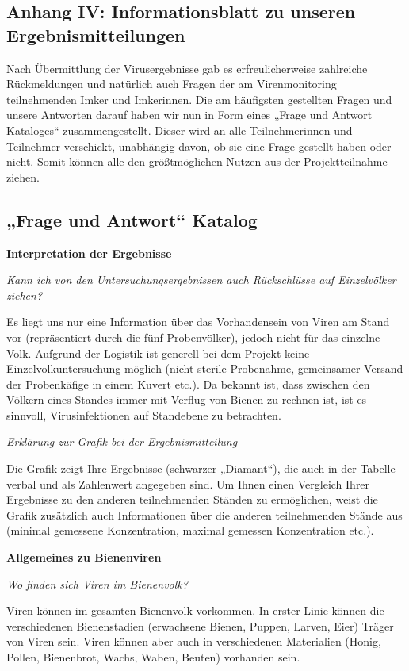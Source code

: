 \subsection{Anhang IV: Informationsblatt zu unseren Ergebnismitteilungen} \label{chap:anhang_FAQ}


Nach Übermittlung der Virusergebnisse gab es erfreulicherweise zahlreiche Rückmeldungen und natürlich auch Fragen der am Virenmonitoring teilnehmenden Imker und Imkerinnen. Die am häufigsten gestellten Fragen und unsere Antworten darauf haben wir nun in Form eines „Frage und Antwort Kataloges“ zusammengestellt. Dieser wird an alle Teilnehmerinnen und Teilnehmer verschickt, unabhängig davon, ob sie eine Frage gestellt haben oder nicht. Somit können alle den größtmöglichen Nutzen aus der Projektteilnahme ziehen.



\subsection{„Frage und Antwort“ Katalog}
\textbf{Interpretation der Ergebnisse}

\textit{Kann ich von den Untersuchungsergebnissen auch Rückschlüsse auf Einzelvölker ziehen?}

Es liegt uns nur eine Information über das Vorhandensein von Viren am Stand vor (repräsentiert durch die fünf Probenvölker), jedoch nicht für das einzelne Volk. Aufgrund der Logistik ist generell bei dem Projekt keine Einzelvolkuntersuchung möglich (nicht-sterile Probenahme, gemeinsamer Versand der Probenkäfige in einem Kuvert etc.). Da bekannt ist, dass zwischen den Völkern eines Standes immer mit Verflug von Bienen zu rechnen ist, ist es sinnvoll, Virusinfektionen auf Standebene zu betrachten.


\textit{Erklärung zur Grafik bei der Ergebnismitteilung}

Die Grafik zeigt Ihre Ergebnisse (schwarzer „Diamant“), die auch in der Tabelle verbal und als Zahlenwert angegeben sind. Um Ihnen einen Vergleich Ihrer Ergebnisse zu den anderen teilnehmenden Ständen zu ermöglichen, weist die Grafik zusätzlich auch Informationen über die anderen teilnehmenden Stände aus (minimal gemessene Konzentration, maximal gemessen Konzentration etc.).

\textbf{Allgemeines zu Bienenviren}

\textit{Wo finden sich Viren im Bienenvolk?}

Viren können im gesamten Bienenvolk vorkommen. In erster Linie können die verschiedenen Bienenstadien (erwachsene Bienen, Puppen, Larven, Eier) Träger von Viren sein. Viren können aber auch in verschiedenen Materialien (Honig, Pollen, Bienenbrot, Wachs, Waben, Beuten) vorhanden sein.

